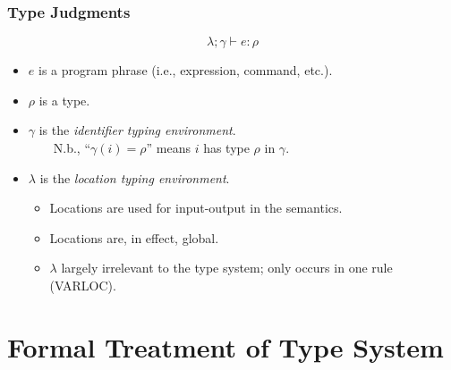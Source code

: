 \documentclass{beamer}
\newcommand{\judgment}[3]{\ensuremath{#1 \vdash #2 : #3}}
\begin{document}
\begin{frame}[fragile]
\frametitle{Type Judgments}
{\Large
\[
\judgment{\lambda ; \gamma}{e}{\rho}
\]
}

\pause
\begin{itemize}
\item $e$ is a program phrase (i.e., expression, command, etc.).
\pause
\item $\rho$ is a type.
\pause
\item $\gamma$ is the \emph{identifier typing environment}.\\~~~~N.b., ``$\gamma(i) = \rho$'' means $i$ has type $\rho$ in $\gamma$.
\pause
\item $\lambda$ is the \emph{location typing environment}.
\begin{itemize}
\item Locations are used for input-output in the semantics.
\item Locations are, in effect, global.
\item $\lambda$ largely irrelevant to the type system; only occurs in one rule (VARLOC).
\end{itemize}
\end{itemize}

\end{frame}


\section{Formal Treatment of Type System}
\end{document}

